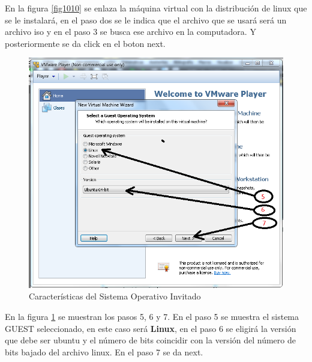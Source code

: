 \documentclass[12pt, twoside]{report}
\begin{document}
En la figura \ref{fig1010} se enlaza la máquina virtual con la distribución de linux que se le instalará, en el paso dos se le indica que el archivo que se usará será un archivo iso y en el paso 3 se busca ese archivo en la computadora. Y posteriormente se da click en el boton next.


\begin{figure}
	\centering
	\includegraphics[width=1.0\linewidth]{VMwarePlayer5y6y7.png}
	\caption{Características del Sistema Operativo Invitado}
	\label{fig1011}
\end{figure}

En la figura \ref{fig1011} se muestran los pasos 5, 6 y 7. En el paso 5 se muestra el sistema GUEST seleccionado, en este caso será \textbf{Linux}, en el paso 6 se eligirá  la versión que debe ser ubuntu y el número de bits coincidir con la versión del número de bits bajado del archivo linux. En el paso 7 se da next.
\end{document}
